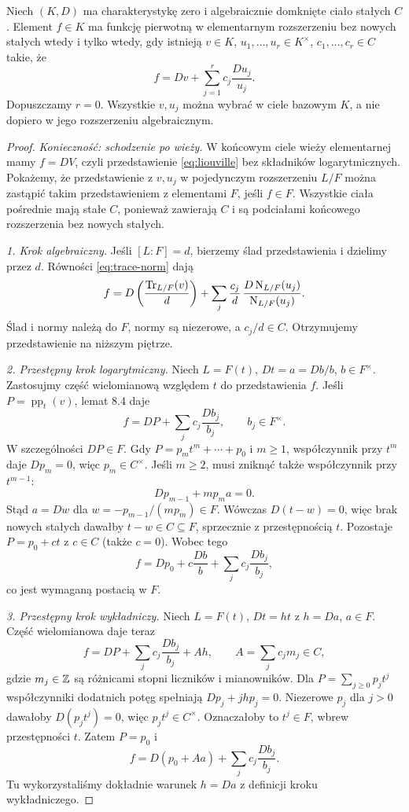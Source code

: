 \begin{twierdzenie}[Liouville'a]
Niech $(K,D)$ ma charakterystykę zero i algebraicznie domknięte ciało stałych $C$. Element $f\in K$ ma funkcję pierwotną w elementarnym rozszerzeniu bez nowych stałych wtedy i tylko wtedy, gdy istnieją $v\in K$, $u_1,\dots,u_r\in K^\times$, $c_1,\dots,c_r\in C$ takie, że
\begin{equation}\label{eq:liouville}
f=Dv+\sum_{j=1}^r c_j\frac{Du_j}{u_j}.
\end{equation}
Dopuszczamy $r=0$. Wszystkie $v,u_j$ można wybrać w ciele bazowym $K$, a nie dopiero w jego rozszerzeniu algebraicznym.
\end{twierdzenie}
\begin{proof}
\emph{Konieczność: schodzenie po wieży.} W końcowym ciele wieży elementarnej mamy $f=DV$, czyli przedstawienie \eqref{eq:liouville} bez składników logarytmicznych. Pokażemy, że przedstawienie z $v,u_j$ w pojedynczym rozszerzeniu $L/F$ można zastąpić takim przedstawieniem z elementami $F$, jeśli $f\in F$. Wszystkie ciała pośrednie mają stałe $C$, ponieważ zawierają $C$ i są podciałami końcowego rozszerzenia bez nowych stałych.

\emph{1. Krok algebraiczny.} Jeśli $[L:F]=d$, bierzemy ślad przedstawienia i dzielimy przez $d$. Równości \eqref{eq:trace-norm} dają
\[
f=D\left(\frac{\operatorname{Tr}_{L/F}(v)}{d}\right)
+\sum_j\frac{c_j}{d}\,
\frac{D\operatorname{N}_{L/F}(u_j)}{\operatorname{N}_{L/F}(u_j)}.
\]
Ślad i normy należą do $F$, normy są niezerowe, a $c_j/d\in C$. Otrzymujemy przedstawienie na niższym piętrze.

\emph{2. Przestępny krok logarytmiczny.} Niech $L=F(t)$, $Dt=a=Db/b$, $b\in F^\times$. Zastosujmy część wielomianową względem $t$ do przedstawienia $f$. Jeśli $P=\operatorname{pp}_t(v)$, lemat 8.4 daje
\[
f=DP+\sum_j c_j\frac{Db_j}{b_j},\qquad b_j\in F^\times.
\]
W szczególności $DP\in F$. Gdy $P=p_mt^m+\cdots+p_0$ i $m\ge1$, współczynnik przy $t^m$ daje $Dp_m=0$, więc $p_m\in C^\times$. Jeśli $m\ge2$, musi zniknąć także współczynnik przy $t^{m-1}$:
\[
Dp_{m-1}+m p_ma=0.
\]
Stąd $a=Dw$ dla $w=-p_{m-1}/(mp_m)\in F$. Wówczas $D(t-w)=0$, więc brak nowych stałych dawałby $t-w\in C\subseteq F$, sprzecznie z przestępnością $t$. Pozostaje $P=p_0+ct$ z $c\in C$ (także $c=0$). Wobec tego
\[
f=Dp_0+c\frac{Db}{b}+\sum_j c_j\frac{Db_j}{b_j},
\]
co jest wymaganą postacią w $F$.

\emph{3. Przestępny krok wykładniczy.} Niech $L=F(t)$, $Dt=ht$ z $h=Da$, $a\in F$. Część wielomianowa daje teraz
\[
f=DP+\sum_j c_j\frac{Db_j}{b_j}+Ah,\qquad A=\sum_j c_jm_j\in C,
\]
gdzie $m_j\in\mathbb{Z}$ są różnicami stopni liczników i mianowników. Dla $P=\sum_{j\ge0}p_jt^j$ współczynniki dodatnich potęg spełniają $Dp_j+jhp_j=0$. Niezerowe $p_j$ dla $j>0$ dawałoby $D(p_jt^j)=0$, więc $p_jt^j\in C^\times$. Oznaczałoby to $t^j\in F$, wbrew przestępności $t$. Zatem $P=p_0$ i
\[
f=D(p_0+Aa)+\sum_j c_j\frac{Db_j}{b_j}.
\]
Tu wykorzystaliśmy dokładnie warunek $h=Da$ z definicji kroku wykładniczego.


\end{proof}
